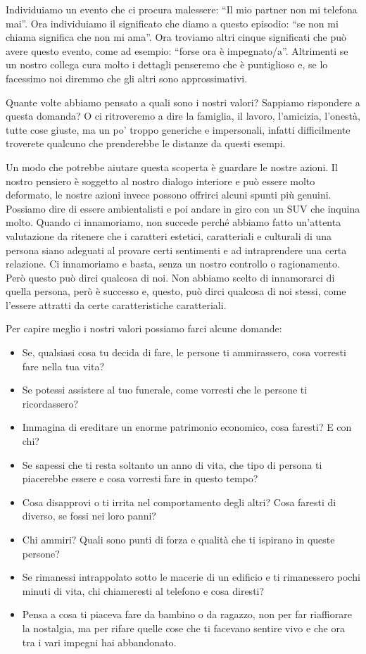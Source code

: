 \documentclass[12pt]{book} %
\begin{document}
Individuiamo un evento che ci procura malessere: “Il mio partner non mi telefona mai”. Ora individuiamo il significato che diamo a questo episodio: “se non mi chiama significa che non mi ama”. Ora troviamo altri cinque significati che può avere questo evento, come ad esempio: “forse ora è impegnato/a”.
Altrimenti se un nostro collega cura molto i dettagli penseremo che è puntiglioso e, se lo facessimo noi diremmo che  gli altri sono approssimativi. 

Quante volte abbiamo pensato a quali sono i nostri valori?
Sappiamo rispondere a questa domanda? O ci ritroveremo a dire la famiglia, il lavoro, l'amicizia, l'onestà, tutte cose giuste, ma un po' troppo generiche e impersonali, infatti difficilmente troverete qualcuno che prenderebbe le distanze da questi esempi.

Un modo che potrebbe aiutare questa scoperta è guardare le nostre azioni. Il nostro pensiero è soggetto al nostro
dialogo interiore e può essere molto deformato, le nostre azioni invece possono offrirci alcuni spunti più genuini.
Possiamo dire di essere ambientalisti e poi andare in giro con un SUV che inquina molto. Quando ci innamoriamo, non succede perché abbiamo fatto
un'attenta valutazione da ritenere che i caratteri estetici, caratteriali e culturali di una persona siano
adeguati al provare certi sentimenti e ad intraprendere una certa relazione. Ci innamoriamo e basta, senza un nostro
controllo o ragionamento. Però questo può dirci qualcosa di noi. Non abbiamo scelto di innamorarci di quella persona,
però è successo e, questo, può dirci qualcosa di noi stessi, come l'essere attratti da certe caratteristiche caratteriali.

Per capire meglio i nostri valori possiamo farci alcune domande:

\begin{itemize}
\item Se, qualsiasi cosa tu decida di fare, le persone ti ammirassero, cosa vorresti fare nella tua vita?
\item Se potessi assistere al tuo funerale, come vorresti che le persone ti ricordassero?
\item Immagina di ereditare un enorme patrimonio economico, cosa faresti? E con chi?
\item Se sapessi che ti resta soltanto un anno di vita, che tipo di persona ti piacerebbe essere e cosa vorresti fare in questo tempo?
\item Cosa disapprovi o ti irrita nel comportamento degli altri? Cosa faresti di diverso, se fossi nei loro panni?
\item Chi ammiri? Quali sono punti di forza e qualità che ti ispirano in queste persone?
\item Se rimanessi intrappolato sotto le macerie di un edificio e ti rimanessero pochi minuti di vita, chi chiameresti al telefono e cosa diresti? 
\item Pensa a cosa ti piaceva fare da bambino o da ragazzo, non per far riaffiorare la nostalgia, ma per rifare quelle cose che ti facevano sentire vivo e che ora tra i vari impegni hai abbandonato.
\end{itemize}
\end{document}
